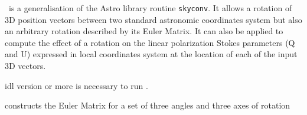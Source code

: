 
\begin{codedescription}
{\thedocid \ is a generalisation of the Astro library routine {\tt skyconv}. It allows
a rotation of 3D position vectors between two standard astronomic coordinates
system but also an arbitrary rotation described by its Euler Matrix.
It can also be applied to compute the effect of a rotation on the
linear polarization Stokes parameters (Q and U) expressed in local
coordinates system at the location of each of the input 3D vectors.}
\end{codedescription}



\begin{related}
  \begin{sulist}{} %
    \item[idl] version \idlversion or more is necessary to run \thedocid.
    \item[\htmlref{euler\_matrix\_new}{idl:euler_matrix_new}] constructs the Euler Matrix for a set of
    three angles and three axes of rotation
  \end{sulist}
\end{related}


